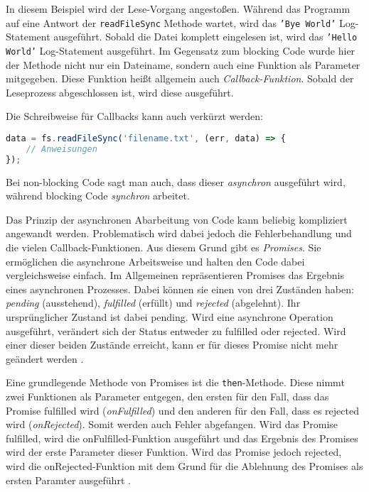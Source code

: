 In diesem Beispiel wird der Lese-Vorgang angestoßen. Während das Programm auf eine Antwort der \texttt{readFileSync} Methode wartet, wird das \texttt{'Bye World'} Log-Statement ausgeführt. Sobald die Datei komplett eingelesen ist, wird das \texttt{'Hello World'} Log-Statement ausgeführt. Im Gegensatz zum blocking Code wurde hier der Methode nicht nur ein Dateiname, sondern auch eine Funktion als Parameter mitgegeben. Diese Funktion heißt allgemein auch \textit{Callback-Funktion}. Sobald der Leseprozess abgeschlossen ist, wird diese ausgeführt.

Die Schreibweise für Callbacks kann auch verkürzt werden: \\

\begin{lstlisting}[title=verkürzte Schreibweise für Callbacks, language=JavaScript]
data = fs.readFileSync('filename.txt', (err, data) => {
	// Anweisungen
});
\end{lstlisting}

Bei non-blocking Code sagt man auch, dass dieser \textit{asynchron} ausgeführt wird, während blocking Code \textit{synchron} arbeitet.

Das Prinzip der asynchronen Abarbeitung von Code kann beliebig kompliziert angewandt werden. Problematisch wird dabei jedoch die Fehlerbehandlung und die vielen Callback-Funktionen. Aus diesem Grund gibt es \textit{Promises}. Sie ermöglichen die asynchrone Arbeitsweise und halten den Code dabei vergleichsweise einfach. Im Allgemeinen repräsentieren Promises das Ergebnis eines asynchronen Prozesses. Dabei können sie einen von drei Zuständen haben: \textit{pending} (ausstehend), \textit{fulfilled} (erfüllt) und \textit{rejected} (abgelehnt). Ihr ursprünglicher Zustand ist dabei pending. Wird eine asynchrone Operation ausgeführt, verändert sich der Status entweder zu fulfilled oder rejected. Wird einer dieser beiden Zustände erreicht, kann er für dieses Promise nicht mehr geändert werden \cite{prom}.

Eine grundlegende Methode von Promises ist die \texttt{then}-Methode. Diese nimmt zwei Funktionen als Parameter entgegen, den ersten für den Fall, dass das Promise fulfilled wird (\textit{onFulfilled}) und den anderen für den Fall, dass es rejected wird (\textit{onRejected}). Somit werden auch Fehler abgefangen. Wird das Promise fulfilled, wird die onFulfilled-Funktion ausgeführt und das Ergebnis des Promises wird der erste Parameter dieser Funktion. Wird das Promise jedoch rejected, wird die onRejected-Funktion mit dem Grund für die Ablehnung des Promises als ersten Paramter ausgeführt \cite{proma}.

